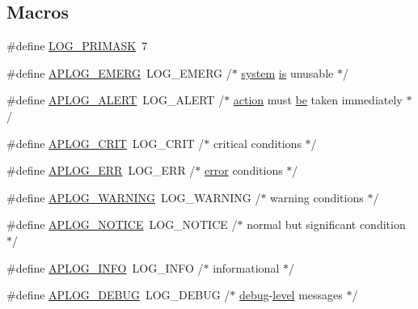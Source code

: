 \subsection*{Macros}
\begin{DoxyCompactItemize}
\item 
\#define \hyperlink{group__APACHE__CORE__LOG_ga709050545b621c5eba19d44e17b5da52}{L\+O\+G\+\_\+\+P\+R\+I\+M\+A\+SK}~7
\item 
\#define \hyperlink{group__APACHE__CORE__LOG_gaa3d7894cd601f48a041689fc21de303d}{A\+P\+L\+O\+G\+\_\+\+E\+M\+E\+RG}~L\+O\+G\+\_\+\+E\+M\+E\+RG       /$\ast$ \hyperlink{pcre_8txt_acd344400255173b94380e8f8cdfa5ddc}{system} \hyperlink{NON-AUTOTOOLS-BUILD_8txt_a2569119f3fd3f0d7d7ecea3c96acb0bf}{is} unusable $\ast$/
\item 
\#define \hyperlink{group__APACHE__CORE__LOG_ga80a3f6767c5810b74c36ab52abff7d87}{A\+P\+L\+O\+G\+\_\+\+A\+L\+E\+RT}~L\+O\+G\+\_\+\+A\+L\+E\+RT       /$\ast$ \hyperlink{pcregrep_8txt_ad076c13c20d71c3dc183a56d9c6145d1}{action} must \hyperlink{NON-AUTOTOOLS-BUILD_8txt_ac08ce70cbd4f453457597ad15ecbebdd}{be} taken immediately $\ast$/
\item 
\#define \hyperlink{group__APACHE__CORE__LOG_ga9f0686ea770c44e205d1c12be74fc21f}{A\+P\+L\+O\+G\+\_\+\+C\+R\+IT}~L\+O\+G\+\_\+\+C\+R\+IT        /$\ast$ critical conditions $\ast$/
\item 
\#define \hyperlink{group__APACHE__CORE__LOG_ga57ad94ed8c92c4306de90479251a5d58}{A\+P\+L\+O\+G\+\_\+\+E\+RR}~L\+O\+G\+\_\+\+E\+RR         /$\ast$ \hyperlink{pcre_8txt_a49f154ded02555c4d15e7861acf2e434}{error} conditions $\ast$/
\item 
\#define \hyperlink{group__APACHE__CORE__LOG_ga73e14aeff380a8a01c66d528162026fe}{A\+P\+L\+O\+G\+\_\+\+W\+A\+R\+N\+I\+NG}~L\+O\+G\+\_\+\+W\+A\+R\+N\+I\+NG     /$\ast$ warning conditions $\ast$/
\item 
\#define \hyperlink{group__APACHE__CORE__LOG_ga23239084d07266623cf5f5830fd28c8c}{A\+P\+L\+O\+G\+\_\+\+N\+O\+T\+I\+CE}~L\+O\+G\+\_\+\+N\+O\+T\+I\+CE      /$\ast$ normal but significant condition $\ast$/
\item 
\#define \hyperlink{group__APACHE__CORE__LOG_ga47fafbef7e478babdd92e90407f95b19}{A\+P\+L\+O\+G\+\_\+\+I\+N\+FO}~L\+O\+G\+\_\+\+I\+N\+FO        /$\ast$ informational $\ast$/
\item 
\#define \hyperlink{group__APACHE__CORE__LOG_gadfcef90537539cf2b7d35cfbbbafeb93}{A\+P\+L\+O\+G\+\_\+\+D\+E\+B\+UG}~L\+O\+G\+\_\+\+D\+E\+B\+UG       /$\ast$ \hyperlink{sdbm__tune_8h_a1614f028c1fef258edfb81fb963609cb}{debug}-\/\hyperlink{group__APACHE__CORE__LOG_ga46c1c4bc138aad1e20504bbee34f35a7}{level} messages $\ast$/

\end{DoxyCompactItemize}
